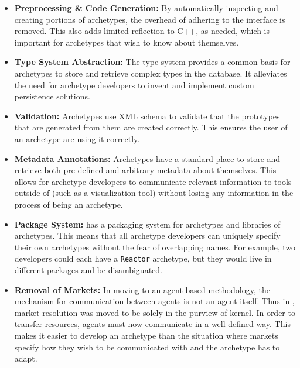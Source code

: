 \begin{itemize}
    \item \textbf{Preprocessing \& Code Generation:}  By automatically 
        inspecting and creating portions of archetypes, the overhead
        of adhering to the \cyclus interface is removed. This also 
        adds limited reflection to C++, as needed, which is important 
        for archetypes that wish to know about themselves.

    \item \textbf{Type System Abstraction:} The \Cyclus type system 
        provides a common basis for archetypes to store and retrieve 
        complex types in the database. It alleviates the need for archetype
        developers to invent and implement custom persistence solutions.

    \item \textbf{Validation:} Archetypes use \gls{XML} schema to validate that 
        the prototypes that are generated from them are created correctly.
        This ensures the user of an archetype are using it correctly.

    \item \textbf{Metadata Annotations:} Archetypes have a standard place to 
        store and retrieve both pre-defined and arbitrary metadata about themselves.
        This allows for archetype developers to communicate relevant information
        to tools outside of \cyclus (such as a visualization tool) without
        losing any information in the process of being an archetype.

    \item \textbf{Package System:} \Cyclus has a packaging system for archetypes and 
        libraries of archetypes. This means that all archetype developers can 
        uniquely specify their own archetypes without the fear of overlapping 
        names.  For example, two developers could each have a \texttt{Reactor}
        archetype, but they would live in different packages and be 
        disambiguated.

    \item \textbf{Removal of Markets:} In moving to an agent-based methodology, 
        the mechanism for communication between agents is not an agent itself.
        Thus in \cyclus, market resolution was moved to be solely in the purview 
        of kernel. In order to transfer resources, agents must now communicate 
        in a well-defined way. This makes it easier to develop an archetype than 
        the situation where markets specify how they wish to be communicated with 
        and the archetype has to adapt. 

\end{itemize}

